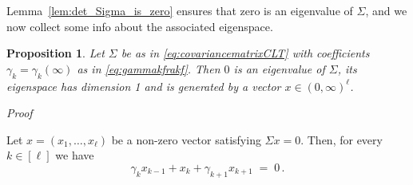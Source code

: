 \documentclass[reqno,a4paper,11pt]{amsart}
\makeatletter
\newtheorem{proposition}[lemma]{Proposition}
\theoremstyle{remark}
\numberwithin{equation}{section}
\renewenvironment{proof}[1][Proof]{\par
\pushQED{\qed}%
\normalfont \topsep6\p@\@plus6\p@\relax
\trivlist
\item\relax
{\itshape
#1\@addpunct{.}}\hspace\labelsep\ignorespaces
}{%
\popQED\endtrivlist\@endpefalse
}
\makeatother
\begin{document}
Lemma~\ref{lem:det_Sigma_is_zero} ensures that zero is an eigenvalue of $\Sigma$, and we now collect some info about the associated eigenspace.

\begin{proposition}
\label{prop:h2_eigenspace_zero}
Let $\Sigma$ be as in \eqref{eq:covariancematrixCLT} with coefficients $\gamma_k=\gamma_k(\infty)$ as in \eqref{eq:gammakfrakf}. Then $0$ is an eigenvalue of $\Sigma$, its eigenspace has dimension 1 and is generated by a vector $x \in (0,\infty)^{\ell}$.
\end{proposition}
\begin{proof}
Let $x=(x_1, \dots, x_\ell)$ be a non-zero vector satisfying $\Sigma x = 0$.
Then, for every $k \in [\ell]$ we have
\begin{equation}
\label{eq:eigen_0_Lk} \tag{$L_k$}
\gamma_{k} x_{k-1} + x_{k}+\gamma_{k+1} x_{k+1} \;=\;0\,.
\end{equation}


\end{proof}
\end{document}
